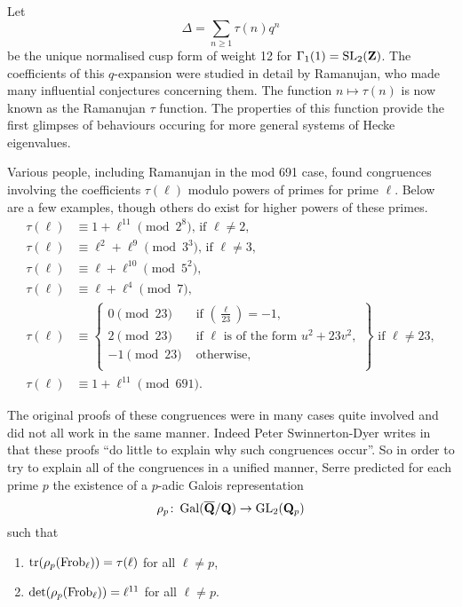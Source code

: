 \documentclass[a4paper,12pt]{article}
\begin{document}
\begin{ex}\label{ex:delt}
Let
\[
\Delta = \sum_{n \ge 1} \tau(n) q^n
\]
be the unique normalised cusp form of weight 12 for $\Gamma_1(1) = \operatorname{SL}_2(\mathbf{Z})$.
The coefficients of this $q$-expansion were studied in detail by Ramanujan, who made many influential conjectures concerning them.
The function $n \mapsto \tau(n)$ is now known as the Ramanujan $\tau$ function.
The properties of this function provide the first glimpses of behaviours occuring for more general systems of Hecke eigenvalues.

Various people, including Ramanujan in the mod 691 case, found congruences involving the coefficients $\tau(\ell)$ modulo powers of primes for prime $\ell$.
Below are a few examples, though others do exist for higher powers of these primes.
\begin{align}
\tau(\ell) &\equiv 1 + \ell^{11} \pmod{2^8}\text{, if } \ell \ne 2,\label{eq:tau2}\\
\tau(\ell) &\equiv \ell^2 + \ell^9 \pmod{3^3}\text{, if } \ell \ne 3,\label{eq:tau3}\\
\tau(\ell) &\equiv \ell + \ell^{10} \pmod{5^2},\label{eq:tau5}\\
\tau(\ell) &\equiv \ell + \ell^4 \pmod{7},\label{eq:tau7}\\
\tau(\ell) &\equiv\left.\begin{cases}
0\pmod{23} & \text{ if } \left(\frac{\ell}{23}\right) = -1,\\
2\pmod{23} & \text{ if }\ell\text{ is of the form } u^2 + 23v^2,\\
-1\pmod{23} & \text{ otherwise},\\
\end{cases}\right\}\text{ if } \ell \ne 23,\label{eq:tau23}\\
\tau(\ell) &\equiv 1 + \ell^{11} \pmod{691}.\label{eq:tau691}
\end{align}

The original proofs of these congruences were in many cases quite involved and did not all work in the same manner.
Indeed Peter Swinnerton-Dyer writes in \cite{SD} that these proofs ``do little to explain why such congruences occur''.
So in order to try to explain all of the congruences in a unified manner, Serre predicted \cite{Serre67} for each prime $p$ the existence of a $p$-adic Galois representation
\[
\rho_p\colon \operatorname{Gal}(\overline{\mathbf{Q}}/\mathbf{Q}) \to \operatorname{GL}_2(\mathbf{Q}_p)
\]
such that
\begin{enumerate}
\item $\operatorname{tr}(\rho_p (\operatorname{Frob}_\ell)) = \tau(\ell)$ for all $\ell \ne p$,\label{item:trace}
\item $\det(\rho_p (\operatorname{Frob}_\ell)) = \ell^{11}$ for all $\ell \ne p$.\label{item:det}
\end{enumerate}


\end{ex}
\end{document}
